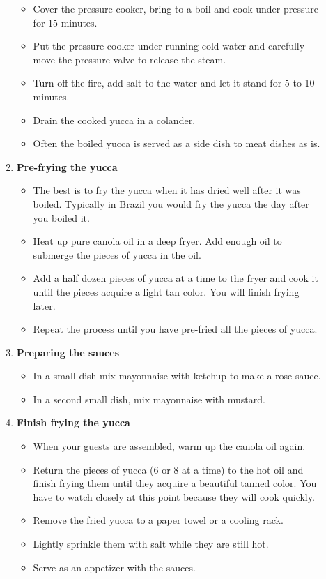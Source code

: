\documentclass[11pt,letterpaper]{article}
\begin{document}
\begin{description}
\begin{enumerate}
\begin{itemize}
	\item Cover the pressure cooker, bring to a boil and cook under pressure for 15 minutes.
	\item Put the pressure cooker under running cold water and carefully move the pressure valve to release the steam.
	\item Turn off the fire, add salt to the water and let it stand for 5 to 10 minutes.
	\item Drain the cooked yucca in a colander.
	\item Often the boiled yucca is served as a side dish to meat dishes as is. 
	\end{itemize}
\newpage
	\item {\bf Pre-frying the yucca}
	\begin{itemize}
	\item The best is to fry the yucca when it has dried well after it was boiled. Typically in Brazil you would fry the yucca the day after you boiled it.
	\item Heat up pure canola oil in a deep fryer. Add enough oil to submerge the pieces of yucca in the oil.
	\item Add a half dozen pieces of yucca at a time to the fryer and cook it until the pieces acquire a light tan color. You will finish frying later.
	\item Repeat the process until you have pre-fried all the pieces of yucca.
	\end{itemize}
	\item {\bf Preparing the sauces}
	\begin{itemize}
	\item In a small dish mix mayonnaise with ketchup to make a rose sauce.
	\item In a second small dish, mix mayonnaise with mustard.
	\end{itemize}
	\item {\bf Finish frying the yucca}
	\begin{itemize}
	\item When your guests are assembled, warm up the canola oil again.
	\item Return the pieces of yucca (6 or 8 at a time) to the hot oil and finish frying them until they acquire a beautiful tanned color. You have to watch closely at this point because they will cook quickly. 
	\item Remove the fried yucca to a paper towel or a cooling rack.
	\item Lightly sprinkle them with salt while they are still hot.
	\item Serve as an appetizer with the sauces.
	\end{itemize}
	\end{enumerate}
\end{description}
\end{document}
